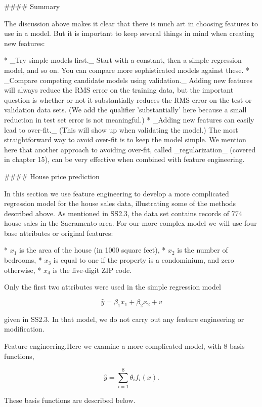 

#### Summary

The discussion above makes it clear that there is much art in choosing features to use in a model. But it is important to keep several things in mind when creating new features:

* _Try simple models first._ Start with a constant, then a simple regression model, and so on. You can compare more sophisticated models against these.
* _Compare competing candidate models using validation._ Adding new features will always reduce the RMS error on the training data, but the important question is whether or not it substantially reduces the RMS error on the test or validation data sets. (We add the qualifier 'substantially' here because a small reduction in test set error is not meaningful.)
* _Adding new features can easily lead to over-fit._ (This will show up when validating the model.) The most straightforward way to avoid over-fit is to keep the model simple. We mention here that another approach to avoiding over-fit, called _regularization_ (covered in chapter 15), can be very effective when combined with feature engineering.

#### House price prediction

In this section we use feature engineering to develop a more complicated regression model for the house sales data, illustrating some of the methods described above. As mentioned in SS2.3, the data set contains records of 774 house sales in the Sacramento area. For our more complex model we will use four base attributes or original features:

* \(x_{1}\) is the area of the house (in 1000 square feet),
* \(x_{2}\) is the number of bedrooms,
* \(x_{3}\) is equal to one if the property is a condominium, and zero otherwise,
* \(x_{4}\) is the five-digit ZIP code.

Only the first two attributes were used in the simple regression model

\[\hat{y}=\beta_{1}x_{1}+\beta_{2}x_{2}+v\]

given in SS2.3. In that model, we do not carry out any feature engineering or modification.

Feature engineering.Here we examine a more complicated model, with 8 basis functions,

\[\hat{y}=\sum_{i=1}^{8}\theta_{i}f_{i}(x).\]

These basis functions are described below.


